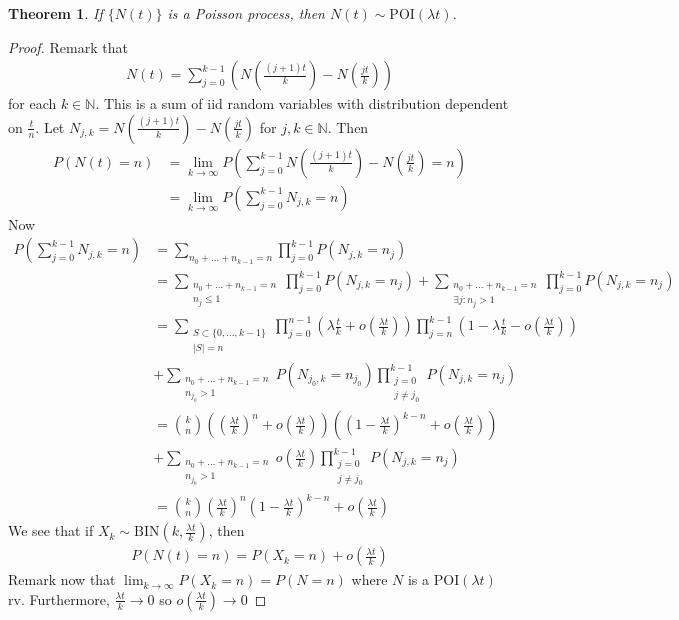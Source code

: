 \documentclass[11pt]{amsart}
\newtheorem{theorem}{Theorem}[section]
\theoremstyle{definition}
\numberwithin{equation}{section}
\begin{document}
 \begin{theorem}\label{poissonfish}
     If $\{N(t)\}$ is a Poisson process, then $N(t)\sim\mathrm{POI}(\lambda t)$.
 \end{theorem}
 \begin{proof}
     Remark that 
     \begin{align*}
         N(t)=\sum_{j=0}^{k-1}\left(N(\frac{(j+1)t}{k})-N(\frac{jt}{k})\right)
     \end{align*}
     for each $k\in\mathbb N$. This is a sum of iid random variables with distribution dependent on $\frac{t}{n}$. Let $N_{j,k}=N(\frac{(j+1)t}{k})-N(\frac{jt}{k})$ for $j,k\in\mathbb N$. Then
     \begin{align*}
         P(N(t)=n)&=\lim_{k\to\infty}P\left(\sum_{j=0}^{k-1}N(\frac{(j+1)t}{k})-N(\frac{jt}{k})=n\right)\\
         &=\lim_{k\to\infty}P\left(\sum_{j=0}^{k-1}N_{j,k}=n\right)
     \end{align*}
     Now
     \begin{align*}
         P\left(\sum_{j=0}^{k-1}N_{j,k}=n\right)&=\sum_{n_0+\ldots+n_{k-1}=n}\prod_{j=0}^{k-1}P(N_{j,k}=n_j)\\
         &=\sum_{\substack{n_0+\ldots+n_{k-1}=n\\n_j\le 1}}\prod_{j=0}^{k-1}P(N_{j,k}=n_j)+\sum_{\substack{n_0+\ldots+n_{k-1}=n\\ \exists j:n_j>1}}\prod_{j=0}^{k-1}P(N_{j,k}=n_j)\\
         &=\sum_{\substack{S\subset\{0,\ldots,k-1\}\\ |S|=n}}\prod_{j=0}^{n-1}\left(\lambda\frac{t}{k}+o(\frac{\lambda t}{k})\right)\prod_{j=n}^{k-1}\left(1-\lambda\frac{t}{k}-o(\frac{\lambda t}{k})\right)\\
         &+\sum_{\substack{n_0+\ldots+n_{k-1}=n\\n_{j_0}>1}}P(N_{j_0,k}=n_{j_0})\prod_{\substack{j=0\\j\ne j_0}}^{k-1}P(N_{j,k}=n_j)\\
         &=\binom{k}{n}\left(\left(\frac{\lambda t}{k}\right)^n+o(\frac{\lambda t}{k})\right)\left(\left(1-\frac{\lambda t}{k}\right)^{k-n}+o(\frac{\lambda t}{k})\right)\\
         &+\sum_{\substack{n_0+\ldots+n_{k-1}=n\\n_{j_0}>1}}o(\frac{\lambda t}{k})\prod_{\substack{j=0\\j\ne j_0}}^{k-1}P(N_{j,k}=n_j)\\
         &=\binom{k}{n}\left(\frac{\lambda t}{k}\right)^n\left(1-\frac{\lambda t}{k}\right)^{k-n}+o(\frac{\lambda t}{k})
     \end{align*}
     We see that if $X_k\sim\mathrm{BIN}(k,\frac{\lambda t}{k})$, then
     \begin{align*}
         P(N(t)=n)=P(X_k=n)+o(\frac{\lambda t}{k})
     \end{align*}
     Remark now that $\lim_{k\to\infty}P(X_k=n)=P(N=n)$ where $N$ is a $\mathrm{POI}(\lambda t)$ rv. Furthermore, $\frac{\lambda t}{k}\to 0$ so $o(\frac{\lambda t}{k})\to 0$
 \end{proof}
\end{document}

